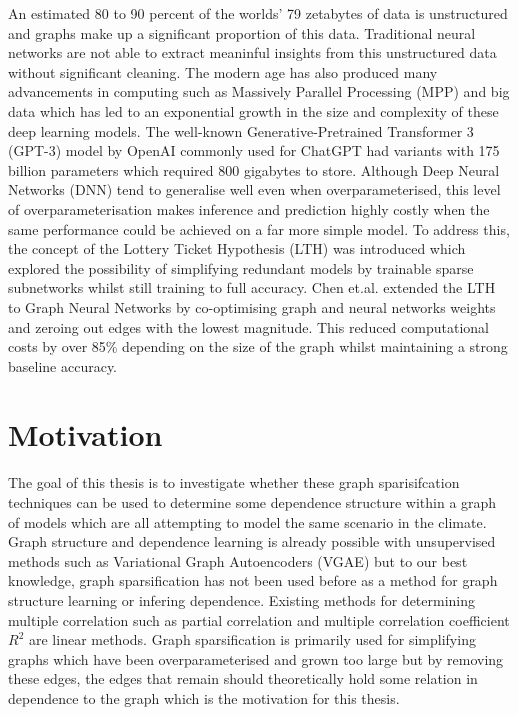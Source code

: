 \documentclass[honours,12pt]{unswthesis}
\numberwithin{equation}{section}
\begin{document}
An estimated 80 to 90 percent of the worlds' 79 zetabytes of data is unstructured and graphs make up a significant proportion of this data\cite{inmon2007tapping}.
Traditional neural networks are not able to extract meaninful insights from this unstructured data without significant cleaning.
The modern age has also produced many advancements in computing such as Massively Parallel Processing (MPP)\cite{nordstrom1992using} 
and big data which has led to an exponential growth in the size and complexity of these deep learning models.
The well-known Generative-Pretrained Transformer 3 (GPT-3) model by OpenAI commonly used for ChatGPT had variants with 175 billion parameters which required 800 gigabytes to store.\cite{radford2018improving}
Although Deep Neural Networks (DNN) tend to generalise well even when overparameterised\cite{Cao_Gu_2020}, this level of overparameterisation makes inference 
and prediction highly costly when the same performance could be achieved on a far more simple model. To address this, the concept of the
Lottery Ticket Hypothesis (LTH)\cite{frankle2020linear} was introduced which explored the possibility of simplifying redundant models by trainable sparse subnetworks whilst still training to full accuracy.
Chen et.al.\cite{chen2021unified} extended the LTH to Graph Neural Networks by co-optimising graph and neural networks weights and zeroing out edges with the lowest magnitude. 
This reduced computational costs by over 85\% depending on the size of the graph whilst maintaining a strong baseline accuracy.

{\section{Motivation}}\label{motivation}

The goal of this thesis is to investigate whether these graph sparisifcation techniques can be used to determine some dependence structure within a graph of models which
are all attempting to model the same scenario in the climate. Graph structure and dependence learning is already possible with unsupervised methods such as Variational Graph Autoencoders (VGAE)\cite{pmlr-v97-yu19a}
but to our best knowledge, graph sparsification has not been used before as a method for graph structure learning or infering dependence. Existing methods for determining multiple correlation such as 
partial correlation and multiple correlation coefficient $R^2$ are linear methods. Graph sparsification is primarily used for simplifying graphs which have been overparameterised and grown too large but 
by removing these edges, the edges that remain should theoretically hold some relation in dependence to the graph which is the motivation for this thesis.
\end{document}
